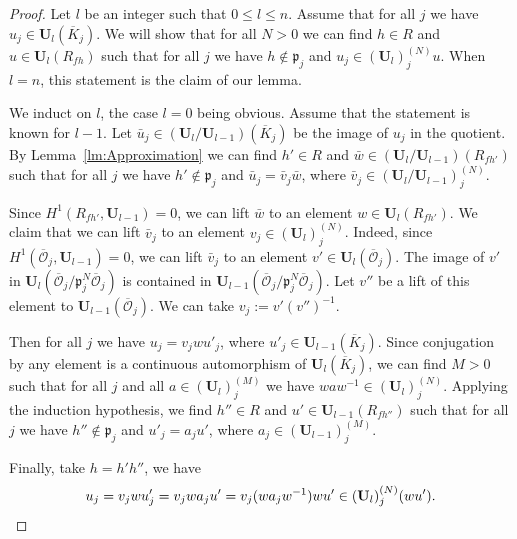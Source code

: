 \documentclass[10pt,a4paper]{amsart}
\newcommand\bU{{\mathbf U}}
\newcommand\cO{{\mathcal{O}}}
\newcommand\fp{{\mathfrak{p}}}
\begin{document}
\begin{proof}
  Let $l$ be an integer such that $0\le l\le n$. Assume that for all $j$ we have $u_j\in\bU_l(\overline K_j)$. We will show that for all $N>0$ we can find $h\in R$ and $u\in\bU_l(R_{fh})$ such that for all $j$ we have $h\notin\fp_j$ and $u_j\in (\bU_l)^{(N)}_ju$. When $l=n$, this statement is the claim of our lemma.

  We induct on $l$, the case $l=0$ being obvious. Assume that the statement is known for $l-1$. Let $\bar u_j\in(\bU_l/\bU_{l-1})(\overline K_j)$ be the image of $u_j$ in the quotient. By Lemma~\ref{lm:Approximation} we can find $h'\in R$ and $\bar w\in(\bU_l/\bU_{l-1})(R_{fh'})$ such that for all $j$ we have $h'\notin\fp_j$ and $\bar u_j=\bar v_j \bar w$, where $\bar v_j\in (\bU_l/\bU_{l-1})^{(N)}_j$.

  Since $H^1(R_{fh'},\bU_{l-1})=0$, we can lift $\bar w$ to an element $w\in\bU_l(R_{fh'})$. We claim that we can lift $\bar v_j$ to an element $v_j\in(\bU_l)^{(N)}_j$. Indeed, since $H^1(\overline\cO_j,\bU_{l-1})=0$, we can lift $\bar v_j$ to an element $v'\in\bU_l(\overline\cO_j)$. The image of $v'$ in $\bU_l(\overline\cO_j/\fp_j^N\overline\cO_j)$ is contained in $\bU_{l-1}(\overline\cO_j/\fp_j^N\overline\cO_j)$.
  Let $v''$ be a lift of this element to $\bU_{l-1}(\overline\cO_j)$. We can take $v_j:=v'(v'')^{-1}$.

  Then for all $j$ we have $u_j=v_jwu'_j$, where $u'_j\in\bU_{l-1}(\overline K_j)$. Since conjugation by any element is a continuous automorphism of $\bU_l(\overline K_j)$, we can find $M>0$ such that for all $j$ and all $a\in(\bU_l)^{(M)}_j$ we have $waw^{-1}\in(\bU_l)^{(N)}_j$. Applying the induction hypothesis, we find $h''\in R$ and $u'\in\bU_{l-1}(R_{fh''})$ such that for all $j$ we have $h''\notin\fp_j$ and $u'_j=a_ju'$, where $a_j\in(\bU_{l-1})^{(M)}_j$.

  Finally, take $h=h'h''$, we have
  \[
    u_j=v_jwu'_j=v_jwa_ju'=v_j(wa_jw^{-1})wu'\in(\bU_l)^{(N)}_j(wu').
  \qedhere\]
\end{proof}
\end{document}
